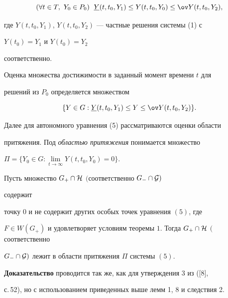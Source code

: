 {$$ 


(\forall t\in T,\ Y_0\in P_0) 


\ \; \ul Y(t,t_0,Y_1)\le Y(t,t_0,Y_0) 


\le\ov Y(t,t_0,Y_2), 


$$ 


где $Y(t,t_0,Y_1)$, $Y(t,t_0,Y_2)$ --- частные решения системы (1) с 


$Y(t_0)=Y_1$ и $Y(t_0)=Y_2$ 


соответственно. 


 


Оценка множества достижимости в заданный момент времени $t$ для 


решений из $P_0$ определяется множеством 


$$ 


\{Y\in G:\ul Y(t,t_0,Y_1)\le Y\le\ov Y(t,t_0,Y_2)\}. 


$$ 


 


Далее для автономного уравнения (5) рассматриваются оценки области 


притяжения. Под {\it областью притяжения} понимается множество 


$\Pi=\{Y_0\in G:\lim\limits_{t\to\infty}Y(t,t_0,Y_0)=0\}$. 


 


\begin{thm} 


Пусть множество $G_+\cap\cal H$ $($соответственно $G_-\cap\cal G)$ 


содержит 


точку $0$ и не содержит других особых точек уравнения $(5)$, где 


$F\in W(G_+)$ и удовлетворяет условиям теоремы $1$. Тогда $G_+\cap\cal 


H$ $($соответственно 


$G_-\cap\cal G)$ лежит в области притяжения $\Pi$ системы $(5)$. 


\end{thm} 


 


{\bf Доказательство} проводится так же, как для утверждения 3 из ([8], 


с.\,52), но с использованием приведенных выше лемм 1, 8 и следствия 2. 


 


}
